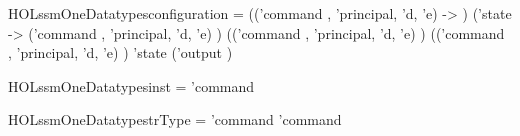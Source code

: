 \newcommand{\HOLssmOneDate}{16 April 2019}
\newcommand{\HOLssmOneTime}{23:35}
\begin{SaveVerbatim}{HOLssmOneDatatypesconfiguration}
 =
     (('command , 'principal, 'd, 'e)  -> )
        ('state -> ('command , 'principal, 'd, 'e) )
        (('command , 'principal, 'd, 'e)  )
        (('command , 'principal, 'd, 'e)  ) 'state
        ('output )
\end{SaveVerbatim}
\newcommand{\HOLssmOneDatatypesconfiguration}{\UseVerbatim{HOLssmOneDatatypesconfiguration}}
\begin{SaveVerbatim}{HOLssmOneDatatypesinst}
 =  'command \HOLTokenBar{} 
\end{SaveVerbatim}
\newcommand{\HOLssmOneDatatypesinst}{\UseVerbatim{HOLssmOneDatatypesinst}}
\begin{SaveVerbatim}{HOLssmOneDatatypestrType}
 =  \HOLTokenBar{}  'command \HOLTokenBar{}  'command
\end{SaveVerbatim}
\newcommand{\HOLssmOneDatatypestrType}{\UseVerbatim{HOLssmOneDatatypestrType}}
\newcommand{\HOLssmOneDatatypes}{
\HOLssmOneDatatypesconfiguration\HOLssmOneDatatypesinst\HOLssmOneDatatypestrType}
